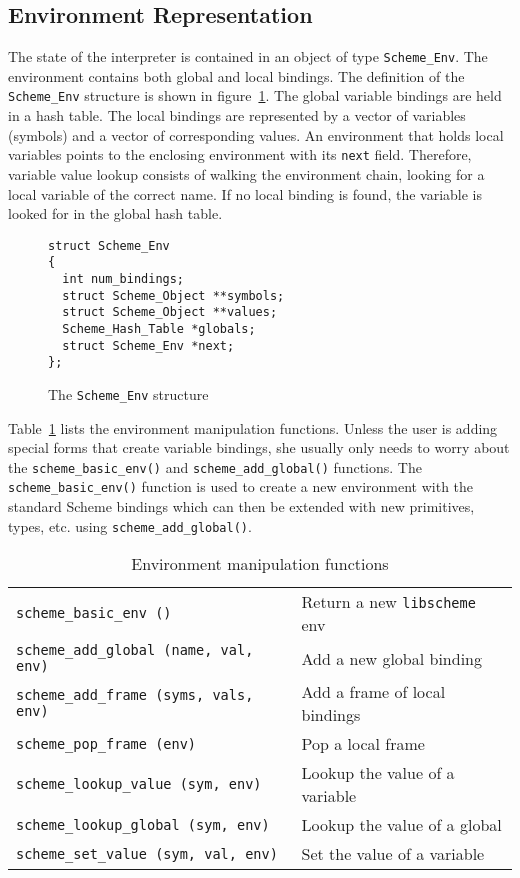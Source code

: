 \subsection{Environment Representation}

The state of the interpreter is contained in an object of type
\verb+Scheme_Env+.  The environment contains both global and local
bindings.  The definition of the \verb+Scheme_Env+ structure is shown
in figure~\ref{fig:env}.  The global variable bindings are held in a
hash table.  The local bindings are represented by a vector of
variables (symbols) and a vector of corresponding values.  An
environment that holds local variables points to the enclosing
environment with its \verb+next+ field.  Therefore, variable value
lookup consists of walking the environment chain, looking for a local
variable of the correct name.  If no local binding is found, the
variable is looked for in the global hash table.

\begin{figure}[htbp]
\begin{center}
\begin{verbatim}
struct Scheme_Env
{
  int num_bindings;
  struct Scheme_Object **symbols;
  struct Scheme_Object **values;
  Scheme_Hash_Table *globals;
  struct Scheme_Env *next;
};
\end{verbatim}
\end{center}
  \caption{The {\tt Scheme\_Env} structure}
  \label{fig:env}
\end{figure}

Table~\ref{tab:env} lists the environment manipulation functions.
Unless the user is adding special forms that create variable bindings,
she usually only needs to worry about the \verb+scheme_basic_env()+
and \verb+scheme_add_global()+ functions.  The 
\verb+scheme_basic_env()+ function is used to create a new environment
with the standard Scheme bindings which can then be extended with new
primitives, types, etc. using \verb+scheme_add_global()+.

\begin{table}[htbp]
\begin{center}
  \begin{tabular}{ll}
    \verb+scheme_basic_env ()+ & Return a new \verb+libscheme+ env \\
    \verb+scheme_add_global (name, val, env)+ & Add a new global binding\\
    \verb+scheme_add_frame (syms, vals, env)+ & Add a frame of local bindings \\
    \verb+scheme_pop_frame (env)+ & Pop a local frame \\
    \verb+scheme_lookup_value (sym, env)+ & Lookup the value of a variable\\
    \verb+scheme_lookup_global (sym, env)+ & Lookup the value of a global\\
    \verb+scheme_set_value (sym, val, env)+ & Set the value of a variable\\
  \end{tabular}
\end{center}
  \caption{Environment manipulation functions}
  \label{tab:env}
\end{table}

